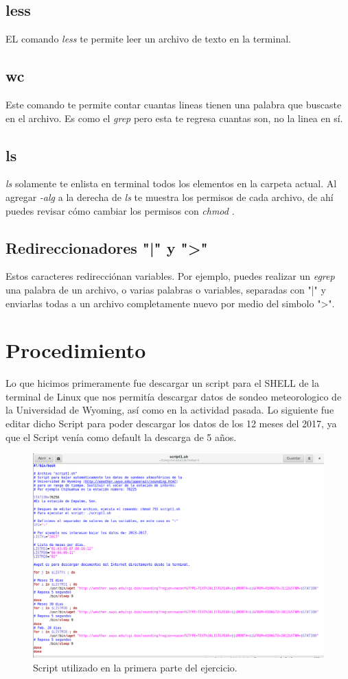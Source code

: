 \documentclass{article}
\begin{document}
\subsection{less}
EL comando \textit{less} te permite leer un archivo de texto en la terminal.
\subsection{wc}
Este comando te permite contar cuantas lineas tienen una palabra que buscaste en el archivo. Es como el \textit{grep} pero esta te regresa cuantas son, no la linea en sí.
\subsection{ls}
\textit{ls} solamente te enlista en terminal todos los elementos en la carpeta actual. 
Al agregar \textit{-alg} a la derecha de \textit{ls} te muestra los permisos de cada archivo, de ahí puedes revisar cómo cambiar los permisos con \textit{chmod} .
\subsection{Redireccionadores "|" y ">"}
Estos caracteres redirecciónan variables. Por ejemplo, puedes realizar un \textit{egrep} una palabra de un archivo, o varias palabras o variables, separadas con "|" y enviarlas todas a un archivo completamente nuevo por medio del simbolo ">".

\section{Procedimiento}
Lo que hicimos primeramente fue descargar un script para el SHELL de la terminal de Linux que nos permitía descargar datos de sondeo meteorologico de la Universidad de Wyoming, así como en la actividad pasada. Lo siguiente fue editar dicho Script para poder descargar los datos de los 12 meses del 2017, ya que el Script venía como default la descarga de 5 años.  

\begin{figure}
\includegraphics[width=\linewidth]{Script 1.png}
\caption{Script utilizado en la primera parte del ejercicio.}
\end{figure}
\end{document}
